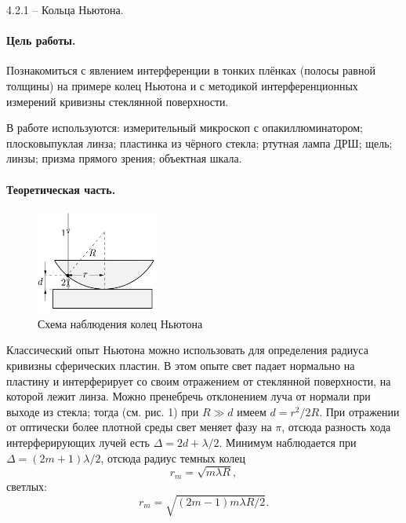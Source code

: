 \documentclass{../lab_class}
\begin{document}
{\Large 4.2.1 -- Кольца Ньютона.}

\paragraph{Цель работы.}
Познакомиться с явлением интерференции в тонких плёнках (полосы равной толщины) на примере колец Ньютона и с методикой интерференционных измерений кривизны стеклянной поверхности.

В работе используются: измерительный микроскоп с опакиллюминатором; плосковыпуклая линза; пластинка из чёрного стекла; ртутная лампа ДРШ; щель; линзы; призма прямого зрения; объектная шкала.

\paragraph{Теоретическая часть.}
\begin{figure}
	\centering
	\includegraphics[width=4cm]{sch01.png}
	\caption{Схема наблюдения колец Ньютона}
	\label{pic:01}
\end{figure}

Классический опыт Ньютона можно использовать для определения радиуса кривизны сферических пластин. В этом опыте свет падает нормально на пластину и интерферирует со своим отражением от стеклянной поверхности, на которой лежит линза. Можно пренебречь отклонением луча от нормали при выходе из стекла; тогда (см. рис. 1) при $R \gg d$ имеем $d = r^2 / 2R$. При отражении от оптически более плотной среды свет меняет фазу на $\pi$, отсюда разность хода интерферирующих лучей есть $\Delta = 2d + \lambda/2$. Минимум наблюдается при $\Delta = (2m+1) \lambda/2$, отсюда радиус темных колец
\begin{equation}\label{eq:01}
	r_m = \sqrt{m \lambda R},
\end{equation}
светлых:
\begin{equation}\label{eq:02}
	r_m = \sqrt{(2m-1) m \lambda R/2}.
\end{equation}
\end{document}
